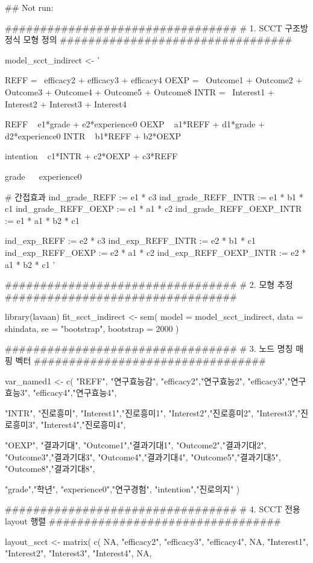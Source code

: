 \documentclass[a4paper]{book}
\begin{document}
\begin{Examples}
\begin{ExampleCode}
\#\# Not run: 

#################################
# 1. SCCT 구조방정식 모형 정의
#################################

model_scct_indirect <- '

REFF =~ efficacy2 + efficacy3 + efficacy4
OEXP =~ Outcome1 + Outcome2 + Outcome3 + Outcome4 + Outcome5 + Outcome8
INTR =~ Interest1 + Interest2 + Interest3 + Interest4

REFF ~ e1*grade + e2*experience0
OEXP ~ a1*REFF + d1*grade + d2*experience0
INTR ~ b1*REFF + b2*OEXP

intention ~ c1*INTR + c2*OEXP + c3*REFF

grade ~~ experience0

# 간접효과
ind_grade_REFF        := e1 * c3
ind_grade_REFF_INTR   := e1 * b1 * c1
ind_grade_REFF_OEXP   := e1 * a1 * c2
ind_grade_REFF_OEXP_INTR := e1 * a1 * b2 * c1

ind_exp_REFF          := e2 * c3
ind_exp_REFF_INTR     := e2 * b1 * c1
ind_exp_REFF_OEXP     := e2 * a1 * c2
ind_exp_REFF_OEXP_INTR := e2 * a1 * b2 * c1
'

#################################
# 2. 모형 추정
#################################

library(lavaan)
fit_scct_indirect <- sem(
  model = model_scct_indirect,
  data  = shindata,
  se = "bootstrap",
  bootstrap = 2000
)

#################################
# 3. 노드 명칭 매핑 벡터
#################################

var_named1 <- c(
  "REFF", "연구효능감",
  "efficacy2","연구효능2",
  "efficacy3","연구효능3",
  "efficacy4","연구효능4",

  "INTR", "진로흥미",
  "Interest1","진로흥미1",
  "Interest2","진로흥미2",
  "Interest3","진로흥미3",
  "Interest4","진로흥미4",

  "OEXP", "결과기대",
  "Outcome1","결과기대1",
  "Outcome2","결과기대2",
  "Outcome3","결과기대3",
  "Outcome4","결과기대4",
  "Outcome5","결과기대5",
  "Outcome8","결과기대8",

  "grade","학년",
  "experience0","연구경험",
  "intention","진로의지"
)

#################################
# 4. SCCT 전용 layout 행렬
#################################

layout_scct <- matrix(
  c(
    NA, "efficacy2", "efficacy3", "efficacy4", NA,
        "Interest1", "Interest2", "Interest3", "Interest4", NA,


\end{ExampleCode}
\end{Examples}
\end{document}
